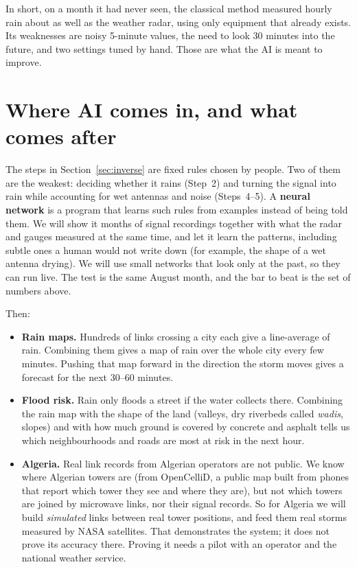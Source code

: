\documentclass[11pt,a4paper]{article}
\begin{document}
In short, on a month it had never seen, the classical method measured hourly rain about as well as the weather radar,
using only equipment that already exists. Its weaknesses are noisy 5-minute values, the need to look 30 minutes into
the future, and two settings tuned by hand. Those are what the AI is meant to improve.

\section{Where AI comes in, and what comes after}

The steps in Section~\ref{sec:inverse} are fixed rules chosen by people. Two of them are the weakest: deciding whether it
rains (Step~2) and turning the signal into rain while accounting for wet antennas and noise (Steps~4--5). A
\textbf{neural network} is a program that learns such rules from examples instead of being told them. We will show it
months of signal recordings together with what the radar and gauges measured at the same time, and let it learn the
patterns, including subtle ones a human would not write down (for example, the shape of a wet antenna drying). We will
use small networks that look only at the past, so they can run live. The test is the same August month, and the bar to
beat is the set of numbers above.

Then:
\begin{itemize}
\item \textbf{Rain maps.} Hundreds of links crossing a city each give a line-average of rain. Combining them gives a map
of rain over the whole city every few minutes. Pushing that map forward in the direction the storm moves gives a forecast
for the next 30--60 minutes.
\item \textbf{Flood risk.} Rain only floods a street if the water collects there. Combining the rain map with the shape of the
land (valleys, dry riverbeds called \emph{wadis}, slopes) and with how much ground is covered by concrete and asphalt tells us
which neighbourhoods and roads are most at risk in the next hour.
\item \textbf{Algeria.} Real link records from Algerian operators are not public. We know where Algerian towers are (from
OpenCelliD, a public map built from phones that report which tower they see and where they are), but not which towers are
joined by microwave links, nor their signal records. So for Algeria we will build \emph{simulated} links between real tower
positions, and feed them real storms measured by NASA satellites. That demonstrates the system; it does not prove its accuracy
there. Proving it needs a pilot with an operator and the national weather service.
\end{itemize}
\end{document}
